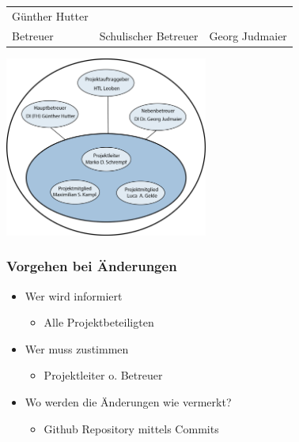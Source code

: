 \documentclass[
    headings=optiontotocandhead,%
    twoside,
    numbers=noenddot,%
    12pt, %
    titlepage, %
    parskip=full, %
    listof=leveldown, 
    numbers=noenddot, %
    a4paper,DIV=14,
    BCOR=15mm,
]{scrbook}
\let\origfigure=\figure
\let\endorigfigure=\endfigure
\renewenvironment{figure}[1][]{%
   \origfigure[H]
}{%
   \endorigfigure
}
\providecommand{\tightlist}{%
  \setlength{\itemsep}{0pt}\setlength{\parskip}{0pt}}
\begin{document}
\begin{longtable}[]{@{}lll@{}}
\begin{minipage}[t]{0.18\columnwidth}
Günther Hutter\strut
\end{minipage}\tabularnewline
\begin{minipage}[t]{0.23\columnwidth}\raggedright
Betreuer\strut
\end{minipage} & \begin{minipage}[t]{0.50\columnwidth}\raggedright
Schulischer Betreuer\strut
\end{minipage} & \begin{minipage}[t]{0.18\columnwidth}\raggedright
Georg Judmaier\strut
\end{minipage}\tabularnewline
\bottomrule
\end{longtable}

\begin{figure}
\centering
\includegraphics[width=0.5\textwidth,height=\textheight]{img/PO-Diagram.png}
\caption{Projektorganisationsdiagramm}
\end{figure}

\hypertarget{vorgehen-bei-uxe4nderungen}{%
\subsubsection{Vorgehen bei
Änderungen}\label{vorgehen-bei-uxe4nderungen}}

\begin{itemize}
\tightlist
\item
  Wer wird informiert

  \begin{itemize}
  \tightlist
  \item
    Alle Projektbeteiligten
  \end{itemize}
\item
  Wer muss zustimmen

  \begin{itemize}
  \tightlist
  \item
    Projektleiter o. Betreuer
  \end{itemize}
\item
  Wo werden die Änderungen wie vermerkt?

  \begin{itemize}
  \tightlist
  \item
    Github Repository mittels Commits
  \end{itemize}
\end{itemize}
\end{document}
